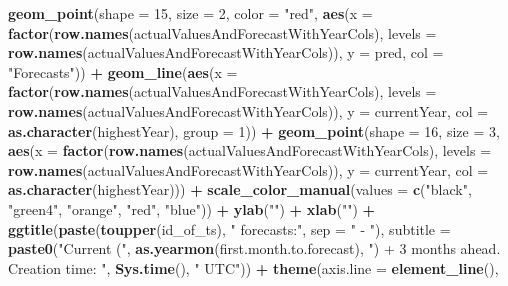 \documentclass[
]{article}
\newenvironment{Shaded}{\begin{snugshade}}{\end{snugshade}}
\newcommand{\AttributeTok}[1]{\textcolor[rgb]{0.13,0.29,0.53}{#1}}
\newcommand{\DecValTok}[1]{\textcolor[rgb]{0.00,0.00,0.81}{#1}}
\newcommand{\FunctionTok}[1]{\textcolor[rgb]{0.13,0.29,0.53}{\textbf{#1}}}
\newcommand{\NormalTok}[1]{#1}
\newcommand{\SpecialCharTok}[1]{\textcolor[rgb]{0.81,0.36,0.00}{\textbf{#1}}}
\newcommand{\StringTok}[1]{\textcolor[rgb]{0.31,0.60,0.02}{#1}}
\begin{document}
\begin{Shaded}
\begin{Highlighting}[]
    \FunctionTok{geom\_point}\NormalTok{(}\AttributeTok{shape =} \DecValTok{15}\NormalTok{, }\AttributeTok{size =} \DecValTok{2}\NormalTok{, }\AttributeTok{color =} \StringTok{"red"}\NormalTok{, }\FunctionTok{aes}\NormalTok{(}\AttributeTok{x =} \FunctionTok{factor}\NormalTok{(}\FunctionTok{row.names}\NormalTok{(actualValuesAndForecastWithYearCols), }\AttributeTok{levels =} \FunctionTok{row.names}\NormalTok{(actualValuesAndForecastWithYearCols)), }\AttributeTok{y =}\NormalTok{ pred, }\AttributeTok{col =} \StringTok{"Forecasts"}\NormalTok{)) }\SpecialCharTok{+}
    \FunctionTok{geom\_line}\NormalTok{(}\FunctionTok{aes}\NormalTok{(}\AttributeTok{x =} \FunctionTok{factor}\NormalTok{(}\FunctionTok{row.names}\NormalTok{(actualValuesAndForecastWithYearCols), }\AttributeTok{levels =} \FunctionTok{row.names}\NormalTok{(actualValuesAndForecastWithYearCols)), }\AttributeTok{y =}\NormalTok{ currentYear, }\AttributeTok{col =} \FunctionTok{as.character}\NormalTok{(highestYear), }\AttributeTok{group =} \DecValTok{1}\NormalTok{)) }\SpecialCharTok{+}
    \FunctionTok{geom\_point}\NormalTok{(}\AttributeTok{shape =} \DecValTok{16}\NormalTok{, }\AttributeTok{size =} \DecValTok{3}\NormalTok{, }\FunctionTok{aes}\NormalTok{(}\AttributeTok{x =} \FunctionTok{factor}\NormalTok{(}\FunctionTok{row.names}\NormalTok{(actualValuesAndForecastWithYearCols), }\AttributeTok{levels =} \FunctionTok{row.names}\NormalTok{(actualValuesAndForecastWithYearCols)), }\AttributeTok{y =}\NormalTok{ currentYear, }\AttributeTok{col =} \FunctionTok{as.character}\NormalTok{(highestYear))) }\SpecialCharTok{+}
    \FunctionTok{scale\_color\_manual}\NormalTok{(}\AttributeTok{values =} \FunctionTok{c}\NormalTok{(}\StringTok{"black"}\NormalTok{, }\StringTok{"green4"}\NormalTok{, }\StringTok{"orange"}\NormalTok{, }\StringTok{"red"}\NormalTok{, }\StringTok{"blue"}\NormalTok{)) }\SpecialCharTok{+}
    \FunctionTok{ylab}\NormalTok{(}\StringTok{""}\NormalTok{) }\SpecialCharTok{+}
    \FunctionTok{xlab}\NormalTok{(}\StringTok{""}\NormalTok{) }\SpecialCharTok{+}
    \FunctionTok{ggtitle}\NormalTok{(}\FunctionTok{paste}\NormalTok{(}\FunctionTok{toupper}\NormalTok{(id\_of\_ts), }\StringTok{" forecasts:"}\NormalTok{, }\AttributeTok{sep =} \StringTok{" {-} "}\NormalTok{), }\AttributeTok{subtitle =} \FunctionTok{paste0}\NormalTok{(}\StringTok{"Current ("}\NormalTok{, }\FunctionTok{as.yearmon}\NormalTok{(first.month.to.forecast), }\StringTok{") + 3 months ahead. Creation time: "}\NormalTok{,  }\FunctionTok{Sys.time}\NormalTok{(), }\StringTok{" UTC"}\NormalTok{)) }\SpecialCharTok{+}
    \FunctionTok{theme}\NormalTok{(}\AttributeTok{axis.line =} \FunctionTok{element\_line}\NormalTok{(),}

\end{Highlighting}
\end{Shaded}
\end{document}
